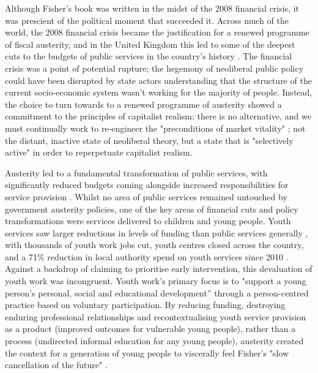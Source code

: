 Although Fisher's book was written in the midst of the 2008 financial crisis, it was prescient of the political moment that succeeded it. Across much of the world, the 2008 financial crisis became the justification for a renewed programme of fiscal austerity, and in the United Kingdom this led to some of the deepest cuts to the budgets of public services in the country's history \citep{lowndes_local_2012}. The financial crisis was a point of potential rupture; the hegemony of neoliberal public policy could have been disrupted by state actors understanding that the structure of the current socio-economic system wasn't working for the majority of people. Instead, the choice to turn towards to a renewed programme of austerity showed a commitment to the principles of capitalist realism: there is no alternative, and we must continually work to re-engineer the "preconditions of market vitality" \citep[p. 60]{connolly_fragility_2013}; not the distant, inactive state of neoliberal theory, but a state that is "selectively active" \citep[p. 21]{connolly_fragility_2013} in order to reperpetuate capitalist realism.

Austerity led to a fundamental transformation of public services, with significantly reduced budgets coming alongside increased responsibilities for service provision \citep{clifford_charitable_2017, jones_uneven_2016}.  Whilst no area of public services remained untouched by government austerity policies, one of the key areas of financial cuts and policy transformations were services delivered to children and young people. Youth services saw larger reductions in levels of funding than public services generally \citep{youdell_assembling_2015}, with thousands of youth work jobs cut, youth centres closed across the country, and a 71\% reduction in local authority spend on youth services since 2010 \citep{ymca_making_2020}. Against a backdrop of claiming to prioritise early intervention, this devaluation of youth work was incongruent. Youth work's primary focus is to "support a young person’s personal, social and educational development” \citep[p. 110]{ord_young_2022} through a person-centred practice based on voluntary participation. By reducing funding, destroying enduring professional relationships  \citep{clayton_distancing_2016} and recontextualising youth service provision as a product (improved outcomes for vulnerable young people), rather than a process (undirected informal education for any young people), austerity created the context for a generation of young people to viscerally feel Fisher's "slow cancellation of the future" \citeyearpar[p. 5]{fisher_ghosts_2014}.

